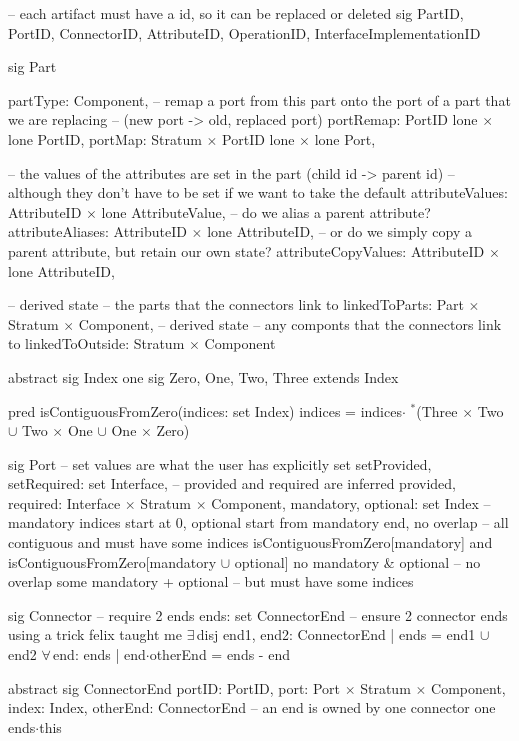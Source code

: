 -- each artifact must have a id, so it can be replaced or deleted
sig PartID, PortID, ConnectorID, AttributeID, OperationID, InterfaceImplementationID {}

sig Part
{
  partType: Component,
  -- remap a port from this part onto the port of a part that we are replacing
  -- (new port -> old, replaced port)
  portRemap: PortID lone$\,\times\,$lone PortID,
  portMap: Stratum$\,\times\,$PortID lone$\,\times\,$lone Port,

  -- the values of the attributes are set in the part   (child id -> parent id)
  -- although they don't have to be set if we want to take the default
  attributeValues: AttributeID$\,\times\,$lone AttributeValue,
  -- do we alias a parent attribute?
  attributeAliases: AttributeID$\,\times\,$lone AttributeID,
  -- or do we simply copy a parent attribute, but retain our own state?
  attributeCopyValues: AttributeID$\,\times\,$lone AttributeID,

  -- derived state -- the parts that the connectors link to
  linkedToParts: Part$\,\times\,$Stratum$\,\times\,$Component,
  -- derived state -- any componts that the connectors link to
  linkedToOutside: Stratum$\,\times\,$Component
}

abstract sig Index {}
one sig Zero, One, Two, Three extends Index {}

pred isContiguousFromZero(indices: set Index)
{
  indices = indices$\cdot$ $\!\!\!^\ast\!$(Three$\,\times\,$Two $\cup$ Two$\,\times\,$One $\cup$ One$\,\times\,$Zero)
}

sig Port
{
  -- set values are what the user has explicitly set
  setProvided, setRequired: set Interface,
  -- provided and required are inferred
  provided, required: Interface$\,\times\,$Stratum$\,\times\,$Component,
  mandatory, optional: set Index
}
{
  -- mandatory indices start at 0, optional start from mandatory end, no overlap
  -- all contiguous and must have some indices
  isContiguousFromZero[mandatory] and
    isContiguousFromZero[mandatory $\cup$ optional]
  no mandatory & optional      -- no overlap
  some mandatory + optional    -- but must have some indices
}


sig Connector
{
    -- require 2 ends
    ends: set ConnectorEnd
}
{
  -- ensure 2 connector ends using a trick felix taught me
  $\exists\,$disj end1, end2: ConnectorEnd | ends = end1 $\cup$ end2
    $\forall\,$end: ends |
        end$\cdot$otherEnd = ends - end
}

abstract sig ConnectorEnd
{
    portID: PortID,
    port: Port$\,\times\,$Stratum$\,\times\,$Component,
    index: Index,
    otherEnd: ConnectorEnd
}
{
    -- an end is owned by one connector
    one ends$\cdot$this
}

